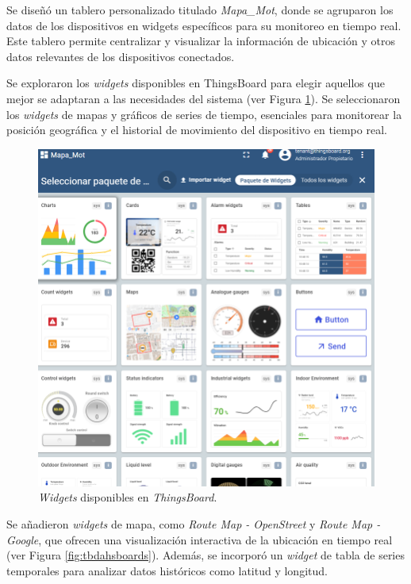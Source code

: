 Se diseñó un tablero personalizado titulado \textit{Mapa\_Mot}, donde se agruparon los datos de los dispositivos en widgets específicos para su monitoreo en tiempo real. Este tablero permite centralizar y visualizar la información de ubicación y otros datos relevantes de los dispositivos conectados.

Se exploraron los \textit{widgets} disponibles en ThingsBoard para elegir aquellos que mejor se adaptaran a las necesidades del sistema (ver Figura \ref{fig:tbpanelelec}). Se seleccionaron los \textit{widgets} de mapas y gráficos de series de tiempo, esenciales para monitorear la posición geográfica y el historial de movimiento del dispositivo en tiempo real.

\begin{figure}[H]
\leavevmode
\begin{minipage}{\textwidth}
\begin{center}
\includegraphics[scale=0.5]{./capitulo_04/imagen/tb/eleccionpanel.png}
\caption{\textit{Widgets} disponibles en \textit{ThingsBoard}. \label{fig:tbpanelelec}}
\end{center}
\end{minipage}
\end{figure}

Se añadieron \textit{widgets} de mapa, como \textit{Route Map - OpenStreet} y \textit{Route Map - Google}, que ofrecen una visualización interactiva de la ubicación en tiempo real (ver Figura \ref{fig:tbdahsboards}). Además, se incorporó un \textit{widget} de tabla de series temporales para analizar datos históricos como latitud y longitud.

